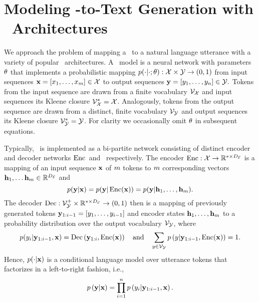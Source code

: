 \section{Modeling \MeaningRepresentation-to-Text Generation with \SequencetoSequence~Architectures}
\label{mrtproblemdef}

We approach the problem of mapping a \meaningrepresentation~to
a natural language utterance with a variety of popular \sequencetosequence~architectures. 
A \sequencetosequence~model is a neural network with parameters $\theta$
that implements a probabilistic mapping
$p(\cdot|\cdot;\theta) : \mathcal{X} \times \mathcal{Y} \rightarrow
(0,1)$ from input sequences $\mathbf{x} = \left[x_1,\ldots,x_{m}\right] \in \mathcal{X}$
to output sequences $\mathbf{y} = \left[y_1, \ldots, y_n\right] \in \mathcal{Y}.$
Tokens from the input sequence are drawn from a finite vocabulary $\mathcal{V}_{\mathcal{X}}$ and input sequences its
Kleene closure $\mathcal{V}_{\mathcal{X}}^* = \mathcal{X}$. 
Analogously, tokens from the output sequence are drawn from a distinct, finite vocabulary $\mathcal{V}_{\mathcal{Y}}$ and output sequences its
Kleene closure $\mathcal{V}_{\mathcal{Y}}^* = \mathcal{Y}$. For clarity we occasionally 
omit $\theta$ in subsequent equations.

Typically, \gen~is implemented as a bi-partite network consisting of distinct
encoder and decoder networks $\operatorname{Enc}$~and \decMod~respectively. 
The encoder $\operatorname{Enc} : \mathcal{X} \rightarrow \mathbb{R}^{*\times{D_\mathcal{E}}}$ is a mapping of an input sequence $\mathbf{x}$ of $m$ tokens to
$m$ corresponding  vectors $\mathbf{h}_1,\ldots\mathbf{h}_{m} \in \mathbb{R}^{{D_\mathcal{E}}}$ and
\[ p(\mathbf{y}|\mathbf{x}) = p(\mathbf{y}|\operatorname{Enc}(\mathbf{x})) = p(\mathbf{y}|\mathbf{h}_1,\ldots,\mathbf{h}_{m}).\]
The decoder $\operatorname{Dec} : \mathcal{V}_{\mathcal{Y}}^+ \times \mathbb{R}^{*\times {D_\mathcal{E}}} \rightarrow (0,1)$ then is 
a mapping of previously generated tokens $\mathbf{y}_{1:i-1} = \left[y_1,\ldots,y_{i-1}\right]$ and encoder states $\mathbf{h}_1,\ldots,\mathbf{h}_{m}$ to a probability distribution over
the output vocabulary $\mathcal{V}_{\mathcal{Y}}$, where
\[ p(y_i|\mathbf{y}_{1:i-1},\mathbf{x}) = \operatorname{Dec}\left(\mathbf{y}_{1:i}, \operatorname{Enc}(\mathbf{x})\right)   \quad \textrm{and} \quad \sum_{y\in \mathcal{V}_{\mathcal{Y}}} p\left(y| \mathbf{y}_{1:i-1}, \operatorname{Enc}(\mathbf{x})\right) = 1.  \]
Hence, $p(\cdot|\mathbf{x})$ is a conditional
language model over utterance tokens that factorizes in a left-to-right fashion, i.e.,
\[p\left( \mathbf{y}| \mathbf{x} \right) = \prod_{i=1}^n p\left(y_i|\mathbf{y}_{1:i-1},\mathbf{x}\right). \]



